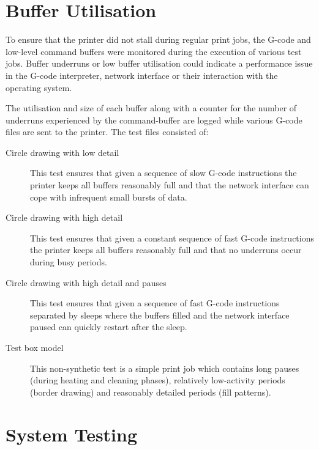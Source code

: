 	\section{Buffer Utilisation}
		
		To ensure that the printer did not stall during regular print jobs, the
		G-code and low-level command buffers were monitored during the execution of
		various test jobs. Buffer underruns or low buffer utilisation could indicate
		a performance issue in the G-code interpreter, network interface or their
		interaction with the operating system.
		
		The utilisation and size of each buffer along with a counter for the number
		of underruns experienced by the command-buffer are logged while various
		G-code files are sent to the printer. The test files consisted of:
		
		\begin{description}
			
			\item[Circle drawing with low detail] This test ensures that given a
			sequence of slow G-code instructions the printer keeps all buffers
			reasonably full and that the network interface can cope with infrequent
			small bursts of data.
			
			\item[Circle drawing with high detail] This test ensures that given a
			constant sequence of fast G-code instructions the printer keeps all
			buffers reasonably full and that no underruns occur during busy periods.
			
			\item[Circle drawing with high detail and pauses] This test ensures that
			given a sequence of fast G-code instructions separated by sleeps where the
			buffers filled and the network interface paused can quickly restart after
			the sleep.
			
			\item[Test box model] This non-synthetic test is a simple print job which
			contains long pauses (during heating and cleaning phases), relatively
			low-activity periods (border drawing) and reasonably detailed periods
			(fill patterns).
			
		\end{description}
		
	
	\section{System Testing}
		
